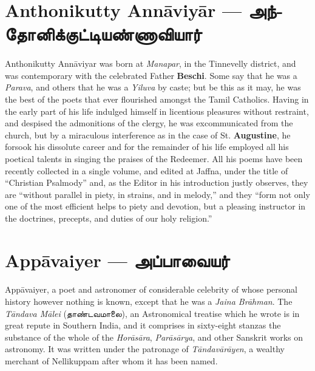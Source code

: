 \documentclass{article}
\newcommand{\TamilText}[1]{\texttamil{#1}}
\newcommand{\TamilBold}[1]{\texttamil{\textbf{#1}}}
\newcommand{\tam}[1]{\TamilText{#1}}
\newcommand{\tambold}[1]{\TamilBold{#1}}
\begin{document}
\section{Anthonikutty Ann\={a}viy\={a}r --- \tambold{அந்தோனிக்குட்டியண்ணாவியார்}}
\paragraph{}
Anthonikutty Ann\={a}viyar was born at \emph{Manapar}, in the Tinnevelly district, and was contemporary with the celebrated Father \textbf{Beschi}. Some say that he was a \emph{Parava}, and others that he was a \emph{Yiluva} by caste; but be this as it may, he was the best of the poets that ever flourished amongst the Tamil Catholics. Having in the early part of his life indulged himself in licentious pleasures without restraint, and despised the admonitions of the clergy, he was excommunicated from the church, but by a miraculous interference as in the case of St. \textbf{Augustine}, he forsook his dissolute career and for the remainder of his life employed all his poetical talents in singing the praises of the Redeemer. All his poems have been recently collected in a single volume, and edited at Jaffna, under the title of ``Christian Psalmody'' and, as the Editor in his introduction justly observes, they are ``without parallel in piety, in strains, and in melody,'' and they ``form not only one of the most efficient helps to piety and devotion, but a pleasing instructor in the doctrines, precepts, and duties of our holy religion.''

\section{App\={a}vaiyer --- \tambold{அப்பாவையர்}}
\paragraph{}
App\={a}vaiyer, a poet and astronomer of considerable celebrity of whose personal history however nothing is known, except that he was a \emph{Jaina Br\={a}hman}. The \emph{T\={a}ndava M\={a}lei} (\tam{தாண்டவமாலை}), an Astronomical treatise which he wrote is in great repute in Southern India, and it comprises in sixty-eight stanzas the substance of the whole of the \emph{Hor\={a}s\={a}ra}, \emph{Par\={a}s\={a}rya}, and other Sanskrit works on astronomy. It was written under the patronage of \emph{T\={a}ndav\={a}r\={a}yen}, a wealthy merchant of Nellikuppam after whom it has been named.
\end{document}
